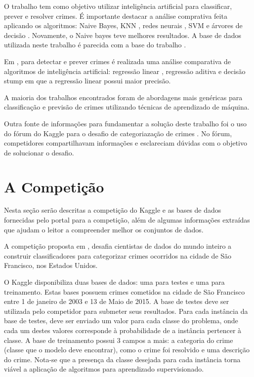 \documentclass[conference]{IEEEtran}
\begin{document}
O trabalho \cite{Shojaee} tem como objetivo utilizar inteligência artificial 
para classificar, prever e resolver crimes. É importante destacar a análise 
comprativa feita aplicando os algoritmos: Naive Bayes\cite{naivebayes}, KNN 
\cite{knn}, redes neurais \cite{redesneurais}, SVM \cite{svm} e árvores de 
decisão \cite{decisiontree}. Novamente, o Naive bayes teve melhores resultados. 
A base de dados utilizada neste trabalho é parecida com a base do trabalho 
\cite{Saeed2015}.

Em \cite{Mcclendon2015}, para detectar e prever crimes é realizada uma análise 
comparativa de algoritmos de inteligência artificial: regressão linear 
\cite{linearregression}, regressão aditiva \cite{additiveregression} e decisão 
stump \cite{decisionstump} em que a regressão linear possui maior precisão.

A maioria dos trabalhos encontrados foram de abordagens mais genéricas para 
classificação e previsão de crimes utilizando técnicas de aprendizado de 
máquina. 

Outra fonte de informações para fundamentar a solução deste trabalho foi o uso 
do fórum do Kaggle para o desafio de categoriazação de crimes 
\cite{kaggleforum}. No fórum, competidores compartilhavam informações e 
esclareciam dúvidas com o objetivo de solucionar o desafio.

\section{A Competição}
Nesta seção serão descritas a competição do Kaggle e as bases de dados 
fornecidas pelo portal para a competição, além de algumas informações extraídas 
que ajudam o leitor a compreender melhor os conjuntos de dados.

A competição proposta em \cite{kaggleforum}, desafia cientistas de dados do 
mundo inteiro a construir classificadores para categorizar crimes ocorridos na 
cidade de São Francisco, nos Estados Unidos.

O Kaggle \cite{kaggle} disponibiliza duas bases de dados: uma para testes e uma 
para treinamento. Estas bases possuem crimes cometidos na cidade de São 
Francisco entre 1 de janeiro de 2003 e 13 de Maio de 2015. A base de testes deve 
ser utilizada pelo competidor para submeter seus resultados. Para cada instância 
da base de testes, deve ser enviado um valor para cada classe do problema, onde 
cada um destes valores corresponde à probabilidade de a instância pertencer à 
classe. A base de treinamento possui 3 campos a mais: a categoria do crime 
(classe que o modelo deve encontrar), como o crime foi resolvido e uma descrição 
do crime. Nota-se que a presença da classe desejada para cada instância torna 
viável a aplicação de algoritmos para aprendizado supervisionado.
\end{document}
